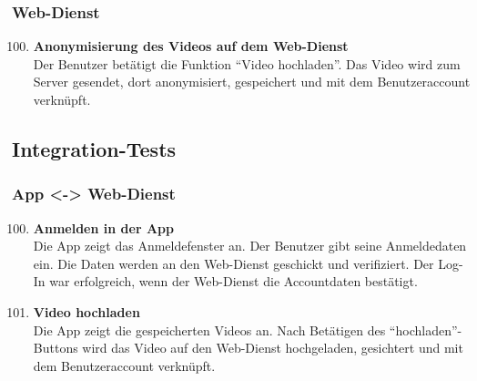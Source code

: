 \subsubsection{Web-Dienst}
\begin{enumerate}[\bfseries{T}10]  
\setcounter{enumi}{99}{}
\item \textbf{Anonymisierung des Videos auf dem Web-Dienst} \hfill\\  
Der Benutzer bet\"atigt die Funktion ``Video hochladen''. Das Video wird zum Server gesendet, dort anonymisiert, gespeichert und mit dem Benutzeraccount verkn\"upft.
\end{enumerate}


\subsection{Integration-Tests}
\subsubsection{App <-> Web-Dienst}
\begin{enumerate}[\bfseries{T}10]  
\setcounter{enumi}{99}{}

\item \textbf{Anmelden in der App} \hfill\\
Die App zeigt das Anmeldefenster an. Der Benutzer gibt seine Anmeldedaten ein. Die Daten werden an den Web-Dienst geschickt und verifiziert. Der Log-In war erfolgreich, wenn der Web-Dienst die Accountdaten best\"atigt.

\item \textbf{Video hochladen} \hfill\\
Die App zeigt die gespeicherten Videos an. Nach Bet\"atigen des ``hochladen''-Buttons wird das Video auf den Web-Dienst hochgeladen, gesichtert und mit dem Benutzeraccount verkn\"upft.
\end{enumerate}

